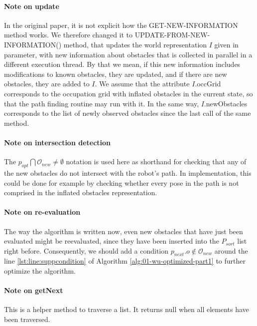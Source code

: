 \paragraph{Note on update}\label{update-from-new-information_note} In the original paper, it is not explicit how the GET-NEW-INFORMATION method works. We therefore changed it to UPDATE-FROM-NEW-INFORMATION() method, that updates the world representation $I$ given in parameter, with new information about obstacles that is collected in parallel in a different execution thread. By that we mean, if this new information includes modifications to known obstacles, they are updated, and if there are new obstacles, they are added to $I$. We assume that the attribute $I$.occGrid corresponds to the occupation grid with inflated obstacles in the current state, so that the path finding routine may run with it. In the same way, $I$.newObstacles corresponds to the list of newly observed obstacles since the last call of the same method.

\paragraph{Note on intersection detection}\label{intersection_note} The $p_{opt} \bigcap \mathcal{O}_{new} \neq \emptyset$ notation is used here as shorthand for checking that any of the new obstacles do not intersect with the robot's path. In implementation, this could be done for example by checking whether every pose in the path is not comprised in the inflated obstacles representation.

\paragraph{Note on re-evaluation}\label{re-evaluation_note} The way the algorithm is written now, even new obstacles that have just been evaluated might be reevaluated, since they have been inserted into the $P_{sort}$ list right before. Consequently, we should add a condition $p_{next}.o \notin \mathcal{O}_{new}$ around the line \ref{lst:line:suppcondition} of Algorithm \ref{alg:01-wu-optimized-part1} to further optimize the algorithm.

\paragraph{Note on getNext}\label{getnext_note} This is a helper method to traverse a list. It returns null when all elements have been traversed.


